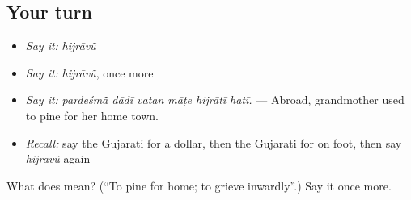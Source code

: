 \subsection*{Your turn}
\begin{itemize}
\raggedright
  \item \emph{Say it:} \emph{hijrāvũ}
  \item \emph{Say it:} \emph{hijrāvũ}, once more
  \item \emph{Say it:} \emph{pardeśmā̃ dādī vatan māṭe hijrātī hatī.} — Abroad, grandmother used to pine for her home town.
  \item \emph{Recall:} say the Gujarati for a dollar, then the Gujarati for on foot, then say \emph{hijrāvũ} again
\end{itemize}

\begin{tcolorbox}[breakable,colback=teal!4,colframe=teal!35!black,title={Before you move on}]
What does  mean? (\textquotedblleft{}To pine for home; to grieve inwardly\textquotedblright{}.) Say it once more.
\end{tcolorbox}
